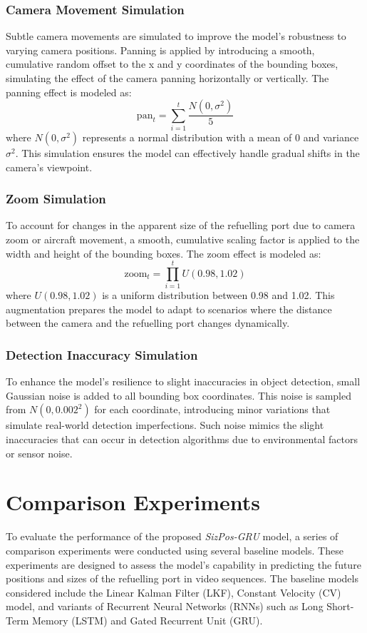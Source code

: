 \documentclass[12pt,oneside]{book} %
\begin{document}
\subsubsection*{Camera Movement Simulation}
\noindent Subtle camera movements are simulated to improve the model's robustness to
varying camera positions. Panning is applied by introducing a smooth,
cumulative random offset to the x and y coordinates of the bounding boxes,
simulating the effect of the camera panning horizontally or vertically. The
panning effect is modeled as:
\[
    \text{pan}_t = \sum_{i=1}^t \frac{N(0, \sigma^2)}{5}
\]
where $N(0, \sigma^2)$ represents a normal distribution with a mean of 0 and
variance $\sigma^2$. This simulation ensures the model can effectively handle
gradual shifts in the camera's viewpoint.

\subsubsection*{Zoom Simulation}

\noindent To account for changes in the apparent size of the refuelling port due to camera
zoom or aircraft movement, a smooth, cumulative scaling factor is applied to
the width and height of the bounding boxes. The zoom effect is modeled as:
\[
    \text{zoom}_t = \prod_{i=1}^t U(0.98, 1.02)
\]
where $U(0.98, 1.02)$ is a uniform distribution between 0.98 and 1.02. This
augmentation prepares the model to adapt to scenarios where the distance
between the camera and the refuelling port changes dynamically.

\subsubsection*{Detection Inaccuracy Simulation}

\noindent To enhance the model's resilience to slight inaccuracies in object detection,
small Gaussian noise is added to all bounding box coordinates. This noise is
sampled from $N(0, 0.002^2)$ for each coordinate, introducing minor variations
that simulate real-world detection imperfections. Such noise mimics the slight
inaccuracies that can occur in detection algorithms due to environmental
factors or sensor noise.

\newpage
\section{Comparison Experiments}
To evaluate the performance of the proposed \textit{SizPos-GRU} model, a series
of comparison experiments were conducted using several baseline models. These
experiments are designed to assess the model's capability in predicting the
future positions and sizes of the refuelling port in video sequences. The
baseline models considered include the Linear Kalman Filter (LKF), Constant
Velocity (CV) model, and variants of Recurrent Neural Networks (RNNs) such as
Long Short-Term Memory (LSTM) and Gated Recurrent Unit (GRU).
\end{document}
